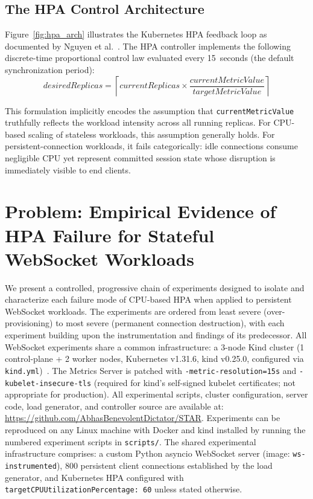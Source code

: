 \documentclass[twocolumn]{svjour3}
\begin{document}
\subsection{The HPA Control Architecture}

Figure~\ref{fig:hpa_arch} illustrates the Kubernetes HPA feedback loop as documented by Nguyen et al.~\cite{nguyen2020hpa}. The HPA controller implements the following discrete-time proportional control law evaluated every 15~seconds (the default synchronization period):
\begin{equation}
\textit{desiredReplicas} = \left\lceil \textit{currentReplicas} \times \frac{\textit{currentMetricValue}}{\textit{targetMetricValue}} \right\rceil
\label{eq:hpa}
\end{equation}

This formulation implicitly encodes the assumption that \texttt{currentMetricValue} truthfully reflects the workload intensity across all running replicas. For CPU-based scaling of stateless workloads, this assumption generally holds. For persistent-connection workloads, it fails categorically: idle connections consume negligible CPU yet represent committed session state whose disruption is immediately visible to end clients.


\section{Problem: Empirical Evidence of HPA Failure for Stateful WebSocket Workloads}
\label{sec:problem}

We present a controlled, progressive chain of experiments designed to isolate and characterize each failure mode of CPU-based HPA when applied to persistent WebSocket workloads. The experiments are ordered from least severe (over-provisioning) to most severe (permanent connection destruction), with each experiment building upon the instrumentation and findings of its predecessor. All WebSocket experiments share a common infrastructure: a 3-node Kind cluster (1 control-plane + 2 worker nodes, Kubernetes v1.31.6, kind v0.25.0, configured via \texttt{kind.yml})~\cite{kind_docs}. The Metrics Server is patched with \texttt{-metric-resolution=15s} and \texttt{-kubelet-insecure-tls} (required for kind's self-signed kubelet certificates; not appropriate for production). All experimental scripts, cluster configuration, server code, load generator, and controller source are available at: \url{https://github.com/AbhasBenevolentDictator/STAR}. Experiments can be reproduced on any Linux machine with Docker and kind installed by running the numbered experiment scripts in \texttt{scripts/}. The shared experimental infrastructure comprises: a custom Python asyncio WebSocket server (image: \texttt{ws-instrumented}), 800 persistent client connections established by the load generator, and Kubernetes HPA configured with \texttt{targetCPUUtilizationPercentage: 60} unless stated otherwise.
\end{document}
